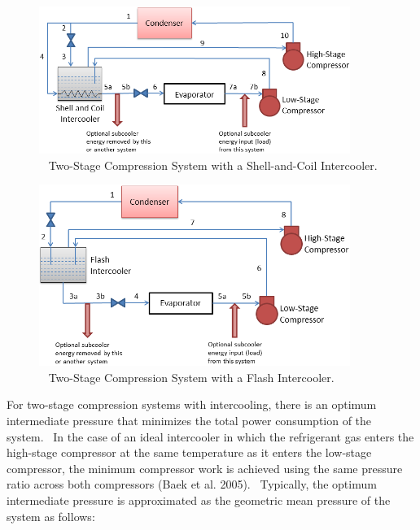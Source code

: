 \begin{figure}[hbtp] %
\centering
\includegraphics[width=0.9\textwidth, height=0.9\textheight, keepaspectratio=true]{media/image6278.png}
\caption{  Two-Stage Compression System with a Shell-and-Coil Intercooler. \protect \label{fig:two-stage-compression-system-with-a-shell}}
\end{figure}

\begin{figure}[hbtp] %
\centering
\includegraphics[width=0.9\textwidth, height=0.9\textheight, keepaspectratio=true]{media/image6279.png}
\caption{  Two-Stage Compression System with a Flash Intercooler. \protect \label{fig:two-stage-compression-system-with-a-flash}}
\end{figure}

For two-stage compression systems with intercooling, there is an optimum intermediate pressure that minimizes the total power consumption of the system.~ In the case of an ideal intercooler in which the refrigerant gas enters the high-stage compressor at the same temperature as it enters the low-stage compressor, the minimum compressor work is achieved using the same pressure ratio across both compressors (Baek et al. 2005).~ Typically, the optimum intermediate pressure is approximated as the geometric mean pressure of the system as follows:

